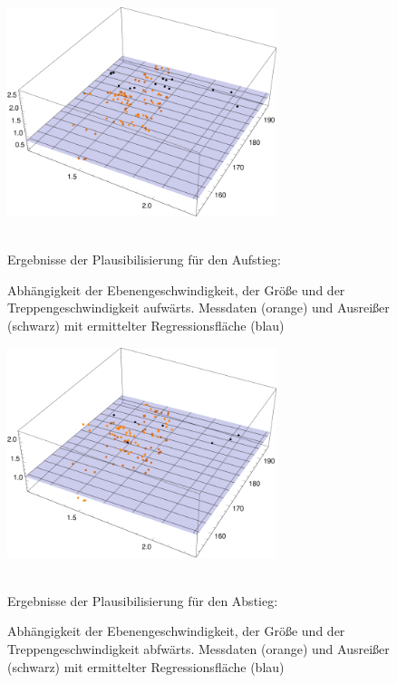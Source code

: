 \begin{figure}[htpb]
\centering
\includegraphics[width=0.7\textwidth]{abbildungen/regression/2012_2017_verbund/ohneausreisser/auf-ebene-groesse.pdf}
\caption{Abhängigkeit der Ebenengeschwindigkeit, der Größe und der Treppengeschwindigkeit aufwärts. Messdaten (orange) und Ausreißer (schwarz) mit ermittelter Regressionsfläche (blau)}
\label{fig:2012_und_2017_OA_auf_ebene_groesse}
\justify \ \\
Ergebnisse der Plausibilisierung für den Aufstieg:

\end{figure}
\begin{figure}[htpb]
\centering
\includegraphics[width=0.7\textwidth]{abbildungen/regression/2012_2017_verbund/ohneausreisser/ab-ebene-groesse.pdf}
\caption{Abhängigkeit der Ebenengeschwindigkeit, der Größe und der Treppengeschwindigkeit abfwärts. Messdaten (orange) und Ausreißer (schwarz) mit ermittelter Regressionsfläche (blau)}
\label{fig:2012_und_2017_OA_ab_ebene_groesse}
\justify \ \\
Ergebnisse der Plausibilisierung für den Abstieg:

\end{figure}









